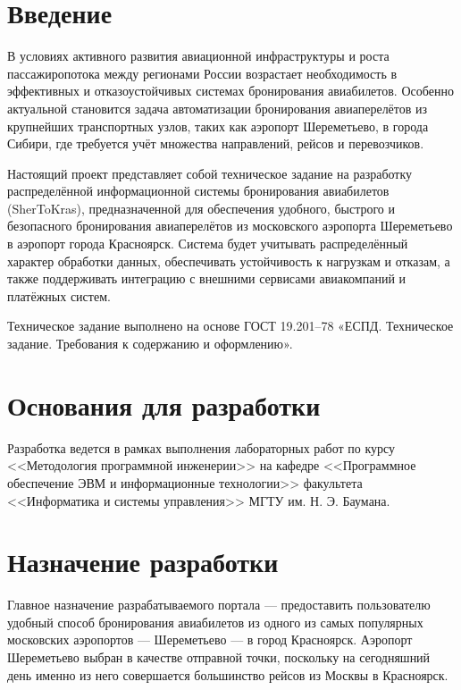 
\section*{Введение}
В условиях активного развития авиационной инфраструктуры и роста пассажиропотока между регионами России возрастает необходимость в эффективных и отказоустойчивых системах бронирования авиабилетов. Особенно актуальной становится задача автоматизации бронирования авиаперелётов из крупнейших транспортных узлов, таких как аэропорт Шереметьево, в города Сибири, где требуется учёт множества направлений, рейсов и перевозчиков.

Настоящий проект представляет собой техническое задание на разработку распределённой информационной системы бронирования авиабилетов (SherToKras), предназначенной для обеспечения удобного, быстрого и безопасного бронирования авиаперелётов из московского аэропорта Шереметьево в аэропорт города Красноярск. Система будет учитывать распределённый характер обработки данных, обеспечивать устойчивость к нагрузкам и отказам, а также поддерживать интеграцию с внешними сервисами авиакомпаний и платёжных систем.

Техническое задание выполнено на основе ГОСТ 19.201–78 «ЕСПД. Техническое задание. Требования к содержанию и оформлению».

\section*{Основания для разработки}

Разработка ведется в рамках выполнения лабораторных работ по курсу <<Методология программной инженерии>> на кафедре <<Программное обеспечение ЭВМ и информационные технологии>> факультета <<Информатика и системы управления>> МГТУ им. Н. Э. Баумана.

\section*{Назначение разработки}

Главное назначение разрабатываемого портала — предоставить пользователю удобный способ бронирования авиабилетов из одного из самых популярных московских аэропортов — Шереметьево — в город Красноярск. Аэропорт Шереметьево выбран в качестве отправной точки, поскольку на сегодняшний день именно из него совершается большинство рейсов из Москвы в Красноярск.

